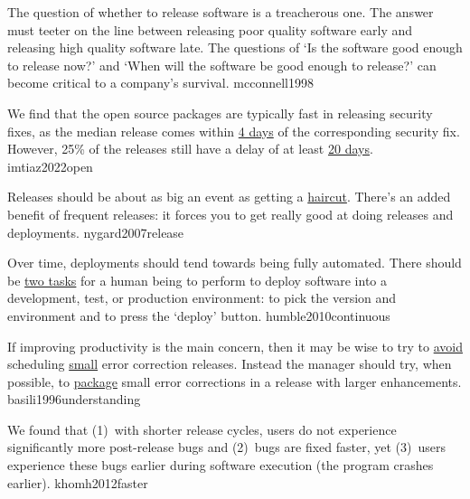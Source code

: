 \documentclass{article}
\begin{document}
  {The question of whether to release software is a treacherous one. The answer must teeter on the line between releasing poor quality software early and releasing high quality software late. The questions of `Is the software good enough to release now?' and `When will the software be good enough to release?' can become critical to a company’s survival.}
  {mcconnell1998}

  {We find that the open source packages are typically fast in releasing security fixes, as the median release comes within \ul{4 days} of the corresponding security fix. However, 25\% of the releases still have a delay of at least \ul{20 days}.}
  {imtiaz2022open}


  {Releases should be about as big an event as getting a \ul{haircut}. There's an added benefit of frequent releases: it forces you to get really good at doing releases and deployments.}
  {nygard2007release}

  {Over time, deployments should tend towards being fully automated. There should be \ul{two tasks} for a human being to perform to deploy software into a development, test, or production environment: to pick the version and environment and to press the `deploy' button.}
  {humble2010continuous}


  {If improving productivity is the main concern, then it may be wise to try to \ul{avoid} scheduling \ul{small} error correction releases. Instead the manager should try, when possible, to \ul{package} small error corrections in a release with larger enhancements.
  }
  {basili1996understanding}

  {We found that (1)~with shorter release cycles, users do not experience significantly more post-release bugs and (2)~bugs are fixed faster, yet (3)~users experience these bugs earlier during software execution (the program crashes earlier).}
  {khomh2012faster}
\end{document}
